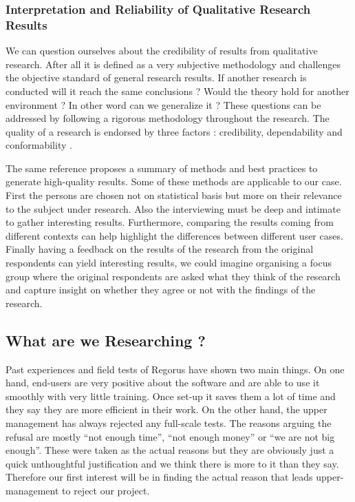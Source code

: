 \documentclass[10pt]{report}
\begin{document}
\subsubsection{Interpretation and Reliability of Qualitative Research Results}
We can question ourselves about the credibility of results from qualitative research. After all it is defined as a very subjective methodology and challenges the objective standard of general research results. If another research is conducted will it reach the same conclusions ? Would the theory hold for another environment ? In other word can we generalize it ? These questions can be addressed by following a rigorous methodology throughout the research. The quality of a research is endorsed by three factors : credibility, dependability and conformability \autocite{carson2001}.

The same reference proposes a summary of methods and best practices to generate high-quality results. Some of these methods are applicable to our case. First the persons are chosen not on statistical basis but more on their relevance to the subject under research. Also the interviewing must be deep and intimate to gather interesting results. Furthermore, comparing the results coming from different contexts can help highlight the differences between different user cases. Finally having a feedback on the results of the research from the original respondents can yield interesting results, we could imagine organising a focus group where the original respondents are asked what they think of the research and capture insight on whether they agree or not with the findings of the research.


\subsection{What are we Researching ?}
Past experiences and field tests of Regorus have shown two main things. On one hand, end-users are very positive about the software and are able to use it smoothly with very little training. Once set-up it saves them a lot of time and they say they are more efficient in their work. On the other hand, the upper management has always rejected any full-scale tests. The reasons arguing the refusal are mostly \enquote{not enough time}, \enquote{not enough money} or \enquote{we are not big enough}. These were taken as the actual reasons but they are obviously just a quick unthoughtful justification and we think there is more to it than they say. Therefore our first interest will be in finding the actual reason that leads upper-management to reject our project.
\end{document}
